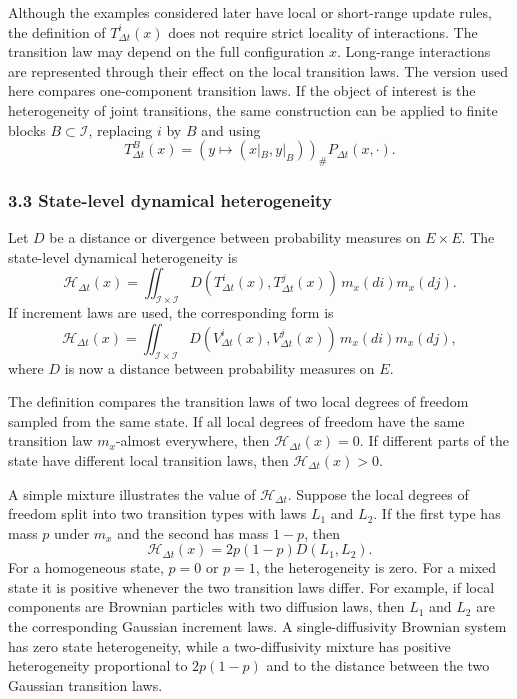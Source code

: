 Although the examples considered later have local or short-range update rules, the definition of \(T_{\Delta t}^{i}(x)\) does not require strict locality of interactions.  The transition law may depend on the full configuration \(x\).  Long-range interactions are represented through their effect on the local transition laws.  The version used here compares one-component transition laws.  If the object of interest is the heterogeneity of joint transitions, the same construction can be applied to finite blocks \(B\subset\mathcal I\), replacing \(i\) by \(B\) and using
\[
  T_{\Delta t}^{B}(x)
  =
  \left(y\mapsto (x|_B,y|_B)\right)_{\#}P_{\Delta t}(x,\cdot).
\]

\subsubsection*{3.3 State-level dynamical heterogeneity}
\label{method:state-heterogeneity}

Let \(D\) be a distance or divergence between probability measures on \(E\times E\).  The state-level dynamical heterogeneity is
\begin{equation}
\mathcal H_{\Delta t}(x)
  =
  \iint_{\mathcal I\times\mathcal I}
  D\left(T_{\Delta t}^{i}(x),T_{\Delta t}^{j}(x)\right)
  \,m_x(di)m_x(dj).
  \label{eq:state-heterogeneity-transition}
\end{equation}
If increment laws are used, the corresponding form is
\begin{equation}
\mathcal H_{\Delta t}(x)
  =
  \iint_{\mathcal I\times\mathcal I}
  D\left(V_{\Delta t}^{i}(x),V_{\Delta t}^{j}(x)\right)
  \,m_x(di)m_x(dj),
  \label{eq:state-heterogeneity-increment}
\end{equation}
where \(D\) is now a distance between probability measures on \(E\).

The definition compares the transition laws of two local degrees of freedom sampled from the same state.  If all local degrees of freedom have the same transition law \(m_x\)-almost everywhere, then \(\mathcal H_{\Delta t}(x)=0\).  If different parts of the state have different local transition laws, then \(\mathcal H_{\Delta t}(x)>0\).

A simple mixture illustrates the value of \(\mathcal H_{\Delta t}\).  Suppose the local degrees of freedom split into two transition types with laws \(L_1\) and \(L_2\).  If the first type has mass \(p\) under \(m_x\) and the second has mass \(1-p\), then
\begin{equation}
\mathcal H_{\Delta t}(x)=2p(1-p)D(L_1,L_2).
  \label{eq:two-type-H}
\end{equation}
For a homogeneous state, \(p=0\) or \(p=1\), the heterogeneity is zero.  For a mixed state it is positive whenever the two transition laws differ.  For example, if local components are Brownian particles with two diffusion laws, then \(L_1\) and \(L_2\) are the corresponding Gaussian increment laws.  A single-diffusivity Brownian system has zero state heterogeneity, while a two-diffusivity mixture has positive heterogeneity proportional to \(2p(1-p)\) and to the distance between the two Gaussian transition laws.


